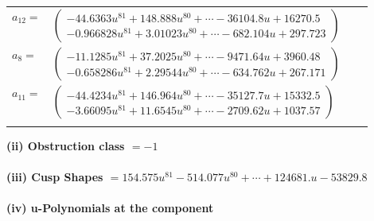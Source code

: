 \documentclass[1p]{elsarticle_modified}
\theoremstyle{definition}
\begin{document}
\begin{tabular}{m{7pt} m{180pt} m{7pt} m{180pt} }
\flushright $a_{12}=$&$\begin{pmatrix}-44.6363 u^{81}+148.888 u^{80}+\cdots-36104.8 u+16270.5\\-0.966828 u^{81}+3.01023 u^{80}+\cdots-682.104 u+297.723\end{pmatrix}$ \\
\flushright $a_{8}=$&$\begin{pmatrix}-11.1285 u^{81}+37.2025 u^{80}+\cdots-9471.64 u+3960.48\\-0.658286 u^{81}+2.29544 u^{80}+\cdots-634.762 u+267.171\end{pmatrix}$ \\
\flushright $a_{11}=$&$\begin{pmatrix}-44.4234 u^{81}+146.964 u^{80}+\cdots-35127.7 u+15332.5\\-3.66095 u^{81}+11.6545 u^{80}+\cdots-2709.62 u+1037.57\end{pmatrix}$\\&\end{tabular}
\flushleft \textbf{(ii) Obstruction class $= -1$}\\~\\
\flushleft \textbf{(iii) Cusp Shapes $= 154.575 u^{81}-514.077 u^{80}+\cdots+124681. u-53829.8$}\\~\\
\newpage\renewcommand{\arraystretch}{1}
\flushleft \textbf{(iv) u-Polynomials at the component}\newline \\
\end{document}
